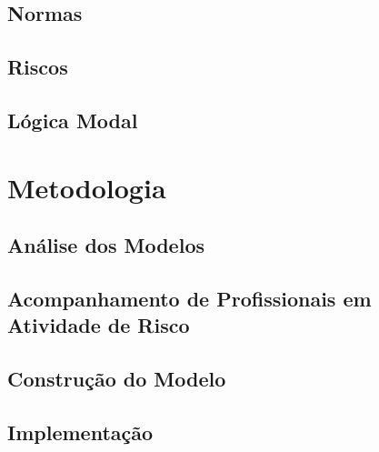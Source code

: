 \documentclass[openright]{normas-utf-tex} %
\begin{document}
		

	\section{Normas} \label{normasdastani}
		


	\section{Riscos} \label{risksec}

		

	\section{Lógica Modal} \label{logic}

		


\chapter{Metodologia}
\label{chap:metod}

	

	\section{Análise dos Modelos}

		

	\section{Acompanhamento de Profissionais em Atividade de Risco}

		

	\section{Construção do Modelo}

		

	\section{Implementação}
\end{document}

